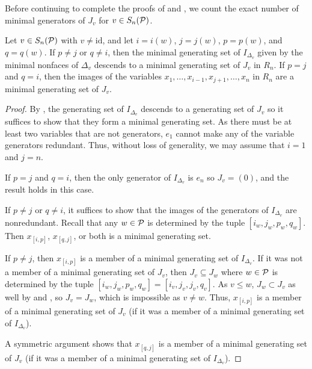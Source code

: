 Before continuing to complete the proofs of  and , we count the exact number of minimal generators of $J_v$ for $v\in S_n(\mathcal{P})$.
\begin{proposition}
\label{prop: min gens of Iv}
    Let $v\in S_n(\mathcal{P})$ with $v\neq \mathrm{id}$, and let $i=i(w)$, $j=j(w)$, $p=p(w)$, and $q=q(w)$. 
    If $p \neq j$ or  $q\neq i$, then the minimal generating set of $I_{\Delta_v}$ given by the minimal nonfaces of $\Delta_v$ descends to a minimal generating set of $J_v$ in $R_n$. 
    If $p = j$ and $q= i$, then the images of the variables $x_1,\dots, x_{i-1}, x_{j+1},\dots, x_n$ in $R_n$  
    are a minimal generating set of $J_v$.
\end{proposition}
\begin{proof}
    By , the generating set of $I_{\Delta_v}$ descends to a generating set of $J_v$ so it suffices to show that they form a minimal generating set. 
    As there must be at least two variables that are not generators, $e_1$ cannot make any of the variable generators redundant.
    Thus, without loss of generality, we may assume that $i=1$ and $j=n$.
    
    If $p=j$ and $q=i$, then the only generator of $I_{\Delta_v}$ is $e_n$ so $J_v = (0)$, and the result holds in this case.

    If $p\neq j$ or $q\neq i$, it suffices to show that the images of the generators of $I_{\Delta_v}$ are nonredundant.
    Recall that any $w\in \mathcal{P}$ is determined by the tuple $[i_w, j_w, p_w,q_w]$.
    Then $x_{[i,p]}$, $x_{[q,j]}$, or both is a minimal generating set.
    
    If $p\neq j$, then $x_{[i,p]}$ is a member of a minimal generating set of $I_{\Delta_v}$.
    If it was not a member of a minimal generating set of $J_v$, then $J_v \subseteq J_w$ where $w\in \mathcal{P}$ is  determined by the tuple $[i_w, j_w, p_w,q_w] = [i_v, j_v, j_v,q_v]$.
    As $v\leq w$, $J_w\subset J_v$ as well by  and , so $J_v=J_w$, which is impossible as $v\neq w$.
    Thus, $x_{[i,p]}$ is a member of a minimal generating set of $J_v$ (if it was a member of a minimal generating set of $I_{\Delta_v}$).

    A symmetric argument shows that $x_{[q,j]}$ is a member of a minimal generating set of $J_v$ (if it was a member of a minimal generating set of $I_{\Delta_v}$).
\end{proof}

